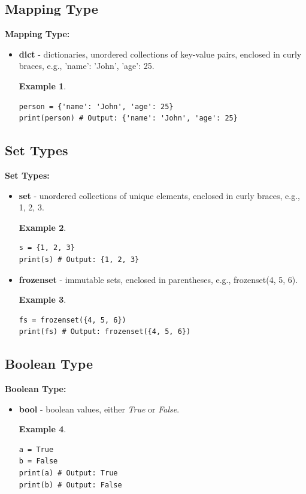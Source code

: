 \documentclass[12pt]{article}
\newtheorem{Example}{Example}[section]
\begin{document}
\subsection{Mapping Type}
\textbf{Mapping Type:}
\begin{itemize}
\item \textbf{dict} - dictionaries, unordered collections of key-value pairs, enclosed in curly braces, e.g., {'name': 'John', 'age': 25}.
\begin{Example}
\begin{lstlisting}
person = {'name': 'John', 'age': 25}
print(person) # Output: {'name': 'John', 'age': 25}
\end{lstlisting}
\end{Example}
\end{itemize}



\subsection{Set Types}
\textbf{Set Types:}
\begin{itemize}
\item \textbf{set} - unordered collections of unique elements, enclosed in curly braces, e.g., {1, 2, 3}.
\begin{Example}
\begin{lstlisting}
s = {1, 2, 3}
print(s) # Output: {1, 2, 3}
\end{lstlisting}
\end{Example}
\item \textbf{frozenset} - immutable sets, enclosed in parentheses, e.g., frozenset({4, 5, 6}).
\begin{Example}
\begin{lstlisting}
fs = frozenset({4, 5, 6})
print(fs) # Output: frozenset({4, 5, 6})
\end{lstlisting}
\end{Example}
\end{itemize}


\subsection{Boolean Type}
\textbf{Boolean Type:}
\begin{itemize}
\item \textbf{bool} - boolean values, either \textit{True} or \textit{False}.
\begin{Example}
\begin{lstlisting}
a = True
b = False
print(a) # Output: True
print(b) # Output: False
\end{lstlisting}
\end{Example}
\end{itemize}
\end{document}
